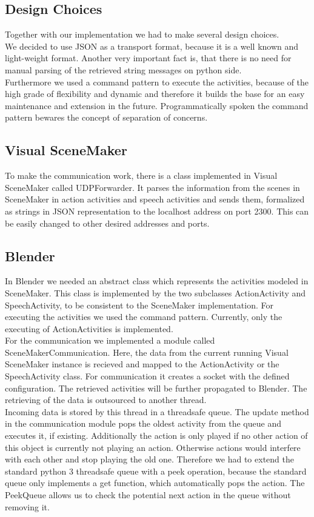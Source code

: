 \documentclass[
10pt, %
a4paper, %
oneside,
headinclude,footinclude, %
BCOR 0mm, %
]{scrartcl}
\begin{document}
\subsection*{Design Choices}
Together with our implementation we had to make several design choices.\\
We decided to use JSON as a transport format, because it is a well known and light-weight format. Another very important fact is, that there is no need for manual parsing of the retrieved string messages on python side.\\
Furthermore we used a command pattern to execute the activities, because of the high grade of flexibility and dynamic and therefore it builds the base for an easy maintenance and extension in the future. Programmatically spoken the command pattern bewares the concept of separation of concerns.
\subsection*{Visual SceneMaker}
To make the communication work, there is a class implemented in Visual SceneMaker called UDPForwarder. It parses the information from the scenes in SceneMaker in action activities and speech activities and sends them, formalized as strings in JSON representation to the localhost address on port 2300. This can be easily changed to other desired addresses and ports.
\subsection*{Blender}
In Blender we needed an abstract class which represents the activities modeled in SceneMaker. This class is implemented by the two subclasses  ActionActivity and SpeechActivity, to be consistent to the SceneMaker implementation. For executing the activities we used the command pattern. Currently, only the executing of ActionActivities is implemented.\\
For the communication we implemented a module called SceneMakerCommunication. Here, the data from the current running Visual SceneMaker instance is recieved and mapped to the ActionActivity or the SpeechActivity class. For communication it creates a socket with the defined configuration. The retrieved
activities will be further propagated to Blender. The retrieving of the data is outsourced to another thread.\\
Incoming data is stored by this thread in a threadsafe queue. The update method in the communication module pops the oldest activity from the queue and executes it, if existing. Additionally the action is only played if no other action of this object is currently not playing an action. Otherwise actions would interfere with each other and stop playing the old one. Therefore we had to extend the standard python 3 threadsafe queue with a peek operation, because the standard queue only implements a get function, which automatically pops the action. The PeekQueue allows us to check the potential next action in the queue without removing it.
\end{document}
